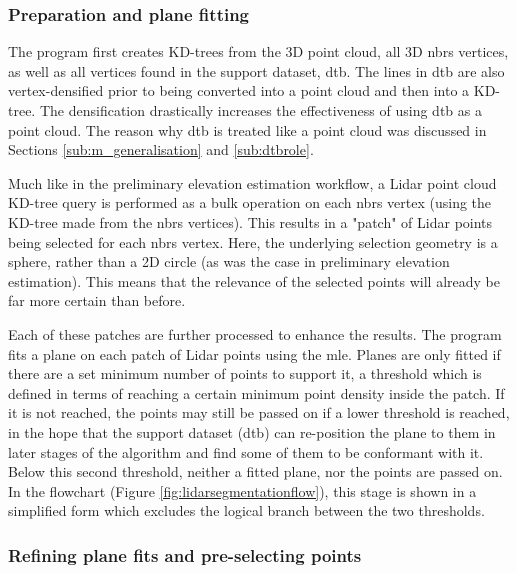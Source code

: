 \subsubsection{Preparation and plane fitting}

The program first creates KD-trees from the 3D point cloud, all 3D \ac{nbrs} vertices, as well as all vertices found in the support dataset, \ac{dtb}. The lines in \ac{dtb} are also vertex-densified prior to being converted into a point cloud and then into a KD-tree. The densification drastically increases the effectiveness of using \ac{dtb} as a point cloud. The reason why \ac{dtb} is treated like a point cloud was discussed in Sections \ref{sub:m_generalisation} and \ref{sub:dtbrole}.

Much like in the preliminary elevation estimation workflow, a Lidar point cloud KD-tree query is performed as a bulk operation on each \ac{nbrs} vertex (using the KD-tree made from the \ac{nbrs} vertices). This results in a "patch" of Lidar points being selected for each \ac{nbrs} vertex. Here, the underlying selection geometry is a sphere, rather than a 2D circle (as was the case in preliminary elevation estimation). This means that the relevance of the selected points will already be far more certain than before.

Each of these patches are further processed to enhance the results. The program fits a plane on each patch of Lidar points using the \ac{mle}. Planes are only fitted if there are a set minimum number of points to support it, a threshold which is defined in terms of reaching a certain minimum point density inside the patch. If it is not reached, the points may still be passed on if a lower threshold is reached, in the hope that the support dataset (\ac{dtb}) can re-position the plane to them in later stages of the algorithm and find some of them to be conformant with it. Below this second threshold, neither a fitted plane, nor the points are passed on. In the flowchart (Figure \ref{fig:lidarsegmentationflow}), this stage is shown in a simplified form which excludes the logical branch between the two thresholds.

\subsubsection{Refining plane fits and pre-selecting points}

